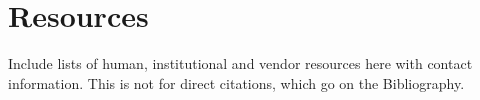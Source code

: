 \chapter{Resources}
\label{cha:resources}

Include lists of human, institutional and vendor resources here with contact information. This is not for direct citations, which go on the Bibliography.